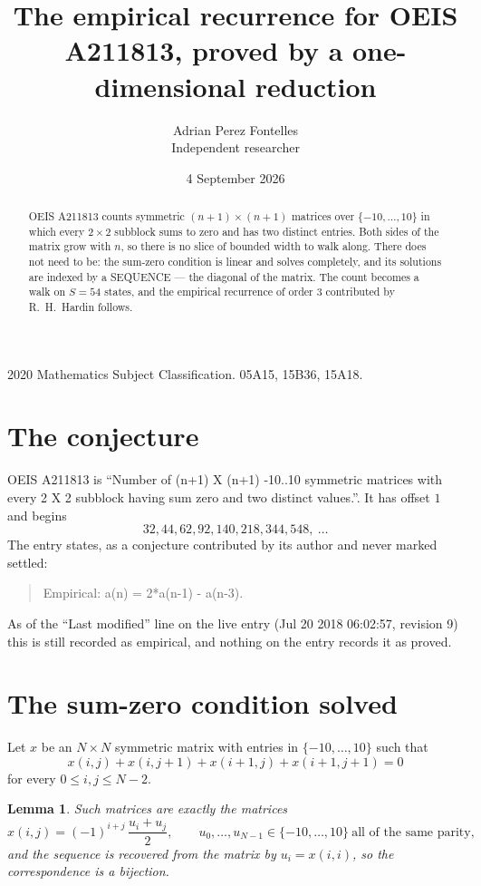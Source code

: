 \documentclass[11pt,a4paper]{article}
\title{The empirical recurrence for OEIS A211813, proved by a one-dimensional reduction}
\author{Adrian Perez Fontelles\\ \small Independent researcher}
\date{4 September 2026}
\theoremstyle{plain}
\newtheorem{lemma}[theorem]{Lemma}
\theoremstyle{definition}
\begin{document}
\maketitle

\begin{abstract}
OEIS A211813 counts symmetric $(n+1)\times(n+1)$ matrices over
$\{-10,\dots,10\}$ in which every $2\times2$ subblock sums to zero and has two distinct
entries. Both sides of the matrix grow with $n$, so there is no slice of bounded width to walk
along. There does not need to be: the sum-zero condition is linear and solves completely, and
its solutions are indexed by a SEQUENCE --- the diagonal of the matrix. The count becomes a walk
on $S=54$ states, and the empirical recurrence of order $3$ contributed by R.~H.~Hardin
follows.
\end{abstract}

\noindent\small 2020 Mathematics Subject Classification. 05A15, 15B36, 15A18.\normalsize

\section{The conjecture}

OEIS A211813 is ``Number of (n+1) X (n+1) -10..10 symmetric matrices with every 2 X 2 subblock having sum zero and two distinct values.''. It has offset $1$ and begins
\[
32, 44, 62, 92, 140, 218, 344, 548,\ \dots
\]
The entry states, as a conjecture contributed by its author and never marked settled:
\begin{quote}
Empirical: a(n) = 2*a(n-1) - a(n-3).
\end{quote}
As of the ``Last modified'' line on the live entry (Jul 20 2018 06:02:57, revision 9) this is still
recorded as empirical, and nothing on the entry records it as proved.

\section{The sum-zero condition solved}

Let $x$ be an $N\times N$ symmetric matrix with entries in $\{-10,\dots,10\}$ such that
\[
x(i,j)+x(i,j{+}1)+x(i{+}1,j)+x(i{+}1,j{+}1)=0
\]
for every $0\le i,j\le N-2$.

\begin{lemma}\label{lem:solve}
Such matrices are exactly the matrices
\[
x(i,j)=(-1)^{i+j}\,\frac{u_i+u_j}{2},
\qquad u_0,\dots,u_{N-1}\in\{-10,\dots,10\}\ \text{all of the same parity},
\]
and the sequence is recovered from the matrix by $u_i=x(i,i)$, so the correspondence is a
bijection.
\end{lemma}
\end{document}
